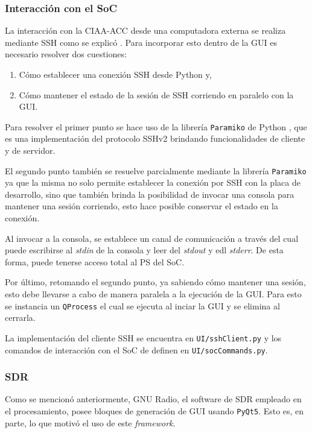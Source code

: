 \documentclass[../../main.tex]{subfiles}
\begin{document}
\subsubsection{Interacción con el SoC}
La interacción con la CIAA-ACC desde una computadora externa se realiza mediante SSH como se explicó . Para incorporar esto dentro de la GUI es necesario resolver dos cuestiones:
\begin{enumerate}
    \item Cómo establecer una conexión SSH desde Python y,
    \item Cómo mantener el estado de la sesión de SSH corriendo en paralelo con la GUI.
\end{enumerate}

Para resolver el primer punto se hace uso de la librería \texttt{Paramiko} de Python \cite{paramiko}, que es una implementación del protocolo SSHv2 brindando funcionalidades de cliente y de servidor.

El segundo punto también se resuelve parcialmente mediante la librería \texttt{Paramiko} ya que la misma no solo permite establecer la conexión por SSH con la placa de desarrollo, sino que también brinda la posibilidad de invocar una consola para mantener una sesión corriendo, esto hace posible conservar el estado en la conexión. 

Al invocar a la consola, se establece un canal de comunicación a través del cual puede escribirse al \textit{stdin} de la consola y leer del \textit{stdout} y edl \textit{stderr}. De esta forma, puede tenerse acceso total al PS del SoC.

Por último, retomando el segundo punto, ya sabiendo cómo mantener una sesión, esto debe llevarse a cabo de manera paralela a la ejecución de la GUI. Para esto se instancia un \texttt{QProcess} el cual se ejecuta al inciar la GUI y se elimina al cerrarla.

La implementación del cliente SSH se encuentra en \texttt{UI/sshClient.py} y los comandos de interacción con el SoC de definen en \texttt{UI/socCommands.py}. 

\subsubsection{SDR}
Como se mencionó anteriormente, GNU Radio, el software de SDR empleado en el procesamiento, posee bloques de generación de GUI usando \texttt{PyQt5}. Esto es, en parte, lo que motivó el uso de este \textit{framework}. 
\end{document}
